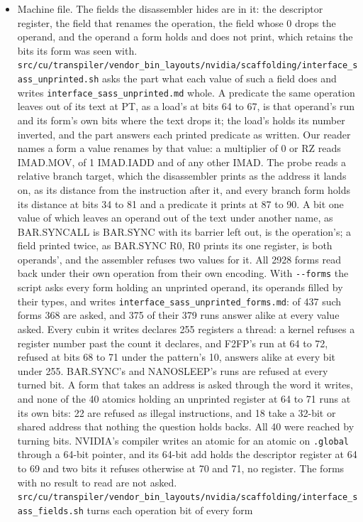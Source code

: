 \begin{enumerate}
\begin{itemize}
\item Machine file. The fields the disassembler hides are in it: the descriptor register, the field that renames the operation, the field whose 0 drops the operand, and the operand a form holds and does not print, which retains the bits its form was seen with. \texttt{src/\allowbreak{}cu/\allowbreak{}transpiler/\allowbreak{}vendor\_\allowbreak{}bin\_\allowbreak{}layouts/\allowbreak{}nvidia/\allowbreak{}scaffolding/\allowbreak{}interface\_\allowbreak{}sass\_\allowbreak{}unprinted.\allowbreak{}sh} asks the part what each value of such a field does and writes \texttt{interface\_\allowbreak{}sass\_\allowbreak{}unprinted.\allowbreak{}md} whole. A predicate the same operation leaves out of its text at PT, as a load's at bits 64 to 67, is that operand's run and its form's own bits where the text drops it; the load's holds its number inverted, and the part answers each printed predicate as written. Our reader names a form a value renames by that value: a multiplier of 0 or RZ reads IMAD.MOV, of 1 IMAD.IADD and of any other IMAD. The probe reads a relative branch target, which the disassembler prints as the address it lands on, as its distance from the instruction after it, and every branch form holds its distance at bits 34 to 81 and a predicate it prints at 87 to 90. A bit one value of which leaves an operand out of the text under another name, as BAR.SYNCALL is BAR.SYNC with its barrier left out, is the operation's; a field printed twice, as BAR.SYNC R0, R0 prints its one register, is both operands', and the assembler refuses two values for it. All 2928 forms read back under their own operation from their own encoding. With \texttt{-\allowbreak{}-\allowbreak{}forms} the script asks every form holding an unprinted operand, its operands filled by their types, and writes \texttt{interface\_\allowbreak{}sass\_\allowbreak{}unprinted\_\allowbreak{}forms.\allowbreak{}md}: of 437 such forms 368 are asked, and 375 of their 379 runs answer alike at every value asked. Every cubin it writes declares 255 registers a thread: a kernel refuses a register number past the count it declares, and F2FP's run at 64 to 72, refused at bits 68 to 71 under the pattern's 10, answers alike at every bit under 255. BAR.SYNC's and NANOSLEEP's runs are refused at every turned bit. A form that takes an address is asked through the word it writes, and none of the 40 atomics holding an unprinted register at 64 to 71 runs at its own bits: 22 are refused as illegal instructions, and 18 take a 32-bit or shared address that nothing the question holds backs. All 40 were reached by turning bits. NVIDIA's compiler writes an atomic for an atomic on \texttt{.\allowbreak{}global} through a 64-bit pointer, and its 64-bit add holds the descriptor register at 64 to 69 and two bits it refuses otherwise at 70 and 71, no register. The forms with no result to read are not asked. \texttt{src/\allowbreak{}cu/\allowbreak{}transpiler/\allowbreak{}vendor\_\allowbreak{}bin\_\allowbreak{}layouts/\allowbreak{}nvidia/\allowbreak{}scaffolding/\allowbreak{}interface\_\allowbreak{}sass\_\allowbreak{}fields.\allowbreak{}sh} turns each operation bit of every form 
\end{itemize}
\end{enumerate}
